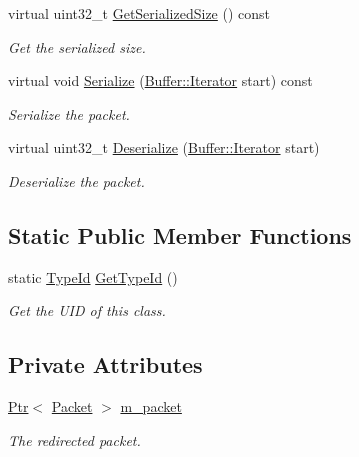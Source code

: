 \begin{DoxyCompactItemize}
virtual uint32\+\_\+t \hyperlink{classns3_1_1Icmpv6OptionRedirected_a293169a209a9b52b4de1516c80261708}{Get\+Serialized\+Size} () const 
\begin{DoxyCompactList}\small\item\em Get the serialized size. \end{DoxyCompactList}\item 
virtual void \hyperlink{classns3_1_1Icmpv6OptionRedirected_a9333a29cdc5f4b4f0807b44afb00b9e9}{Serialize} (\hyperlink{classns3_1_1Buffer_1_1Iterator}{Buffer\+::\+Iterator} start) const 
\begin{DoxyCompactList}\small\item\em Serialize the packet. \end{DoxyCompactList}\item 
virtual uint32\+\_\+t \hyperlink{classns3_1_1Icmpv6OptionRedirected_a14bb7113257521bbc15a9df4e0e134ba}{Deserialize} (\hyperlink{classns3_1_1Buffer_1_1Iterator}{Buffer\+::\+Iterator} start)
\begin{DoxyCompactList}\small\item\em Deserialize the packet. \end{DoxyCompactList}\end{DoxyCompactItemize}
\subsection*{Static Public Member Functions}
\begin{DoxyCompactItemize}
\item 
static \hyperlink{classns3_1_1TypeId}{Type\+Id} \hyperlink{classns3_1_1Icmpv6OptionRedirected_a91950db0d75d75eb85a360e8862849bd}{Get\+Type\+Id} ()
\begin{DoxyCompactList}\small\item\em Get the U\+ID of this class. \end{DoxyCompactList}\end{DoxyCompactItemize}
\subsection*{Private Attributes}
\begin{DoxyCompactItemize}
\item 
\hyperlink{classns3_1_1Ptr}{Ptr}$<$ \hyperlink{classns3_1_1Packet}{Packet} $>$ \hyperlink{classns3_1_1Icmpv6OptionRedirected_a3b16f20784c55f8d9ef3a22817eed135}{m\+\_\+packet}
\begin{DoxyCompactList}\small\item\em The redirected packet. \end{DoxyCompactList}\end{DoxyCompactItemize}
